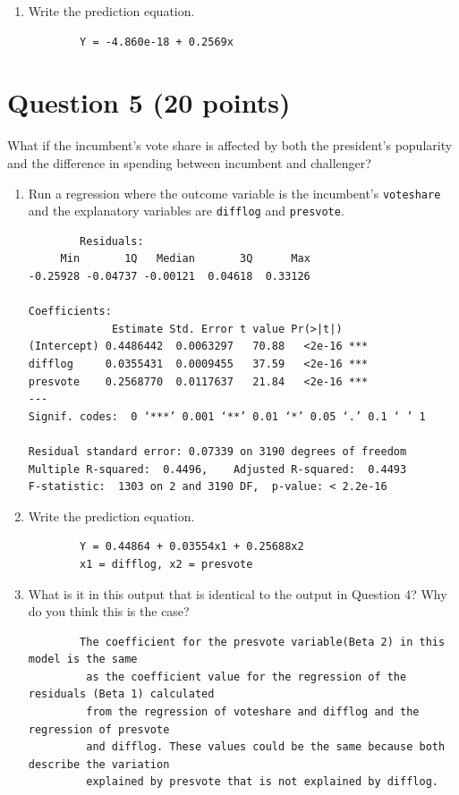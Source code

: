 \documentclass[12pt,letterpaper]{article}
\begin{document}
\begin{enumerate}
		\item Write the prediction equation.
	\begin{verbatim}
		Y = -4.860e-18 + 0.2569x
	\end{verbatim}
	\end{enumerate}
	
	\newpage	

\section*{Question 5 (20 points)}
\noindent What if the incumbent's vote share is affected by both the president's popularity and the difference in spending between incumbent and challenger? 
	\begin{enumerate}
		\item Run a regression where the outcome variable is the incumbent's \texttt{voteshare} and the explanatory variables are \texttt{difflog} and \texttt{presvote}.
			
		\begin{verbatim}
		Residuals:
     Min       1Q   Median       3Q      Max 
-0.25928 -0.04737 -0.00121  0.04618  0.33126 

Coefficients:
             Estimate Std. Error t value Pr(>|t|)    
(Intercept) 0.4486442  0.0063297   70.88   <2e-16 ***
difflog     0.0355431  0.0009455   37.59   <2e-16 ***
presvote    0.2568770  0.0117637   21.84   <2e-16 ***
---
Signif. codes:  0 ‘***’ 0.001 ‘**’ 0.01 ‘*’ 0.05 ‘.’ 0.1 ‘ ’ 1

Residual standard error: 0.07339 on 3190 degrees of freedom
Multiple R-squared:  0.4496,	Adjusted R-squared:  0.4493 
F-statistic:  1303 on 2 and 3190 DF,  p-value: < 2.2e-16
		\end{verbatim}
		
		\item Write the prediction equation.
		\begin{verbatim}
		Y = 0.44864 + 0.03554x1 + 0.25688x2
		x1 = difflog, x2 = presvote
		\end{verbatim}
		
		\item What is it in this output that is identical to the output in Question 4? Why do you think this is the case?	\vspace{5cm}
		\begin{verbatim}
		The coefficient for the presvote variable(Beta 2) in this model is the same
		 as the coefficient value for the regression of the residuals (Beta 1) calculated 
		 from the regression of voteshare and difflog and the regression of presvote 
		 and difflog. These values could be the same because both describe the variation 
		 explained by presvote that is not explained by difflog. 
		
		\end{verbatim}
	\end{enumerate}
\end{document}
